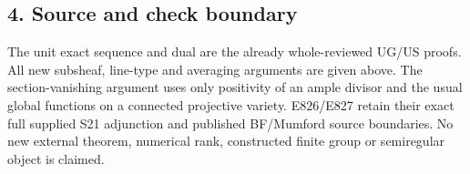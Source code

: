 \subsection{4. Source and check boundary}\label{SF-E828:source-and-check-boundary}

The unit exact sequence and dual are the already whole-reviewed UG/US
proofs. All new subsheaf, line-type and averaging arguments are given above.
The section-vanishing argument uses only positivity of an ample divisor and
the usual global functions on a connected projective variety. E826/E827
retain their exact full supplied S21 adjunction and published BF/Mumford
source boundaries. No new external theorem, numerical rank, constructed
finite group or semiregular object is claimed.
